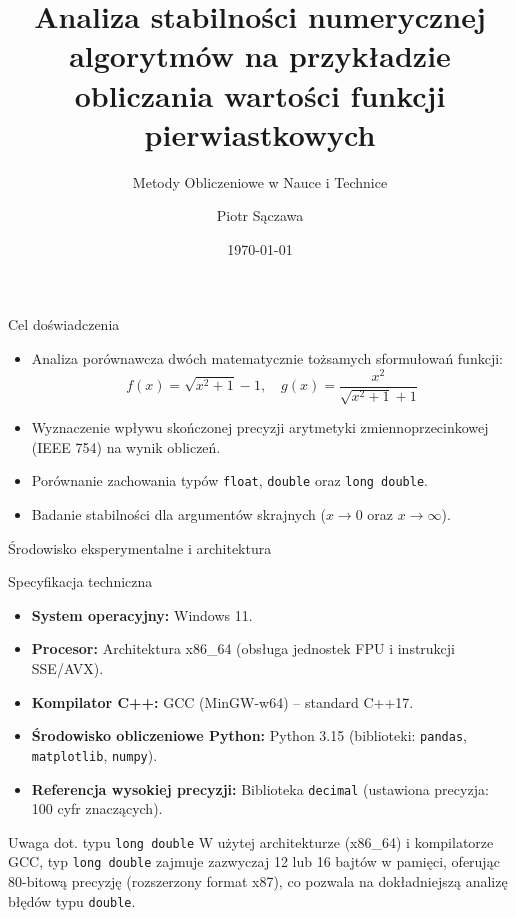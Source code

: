 \documentclass[10pt]{beamer}
\title{Analiza stabilności numerycznej algorytmów na przykładzie obliczania wartości funkcji pierwiastkowych}
\subtitle{Metody Obliczeniowe w Nauce i Technice}
\author{Piotr Sączawa}
\date{\today}
\begin{document}
\begin{frame}
    \titlepage
\end{frame}

\begin{frame}{Cel doświadczenia}
    \begin{itemize}
        \item Analiza porównawcza dwóch matematycznie tożsamych sformułowań funkcji:
        \begin{equation*}
            f(x) = \sqrt{x^2 + 1} - 1, \quad g(x) = \frac{x^2}{\sqrt{x^2 + 1} + 1}
        \end{equation*}
        \item Wyznaczenie wpływu skończonej precyzji arytmetyki zmiennoprzecinkowej (IEEE 754) na wynik obliczeń.
        \item Porównanie zachowania typów \texttt{float}, \texttt{double} oraz \texttt{long double}.
        \item Badanie stabilności dla argumentów skrajnych ($x \to 0$ oraz $x \to \infty$).
    \end{itemize}
\end{frame}

\begin{frame}{Środowisko eksperymentalne i architektura}
    \begin{block}{Specyfikacja techniczna}
        \begin{itemize}
            \item \textbf{System operacyjny:} Windows 11.
            \item \textbf{Procesor:} Architektura x86\_64 (obsługa jednostek FPU i instrukcji SSE/AVX).
            \item \textbf{Kompilator C++:} GCC (MinGW-w64) -- standard C++17.
            \item \textbf{Środowisko obliczeniowe Python:} Python 3.15 (biblioteki: \texttt{pandas}, \texttt{matplotlib}, \texttt{numpy}).
            \item \textbf{Referencja wysokiej precyzji:} Biblioteka \texttt{decimal} (ustawiona precyzja: 100 cyfr znaczących).
        \end{itemize}
    \end{block}
    
    \begin{alertblock}{Uwaga dot. typu \texttt{long double}}
        W użytej architekturze (x86\_64) i kompilatorze GCC, typ \texttt{long double} zajmuje zazwyczaj 12 lub 16 bajtów w pamięci, oferując 80-bitową precyzję (rozszerzony format x87), co pozwala na dokładniejszą analizę błędów typu \texttt{double}.
    \end{alertblock}
\end{frame}
\end{document}
